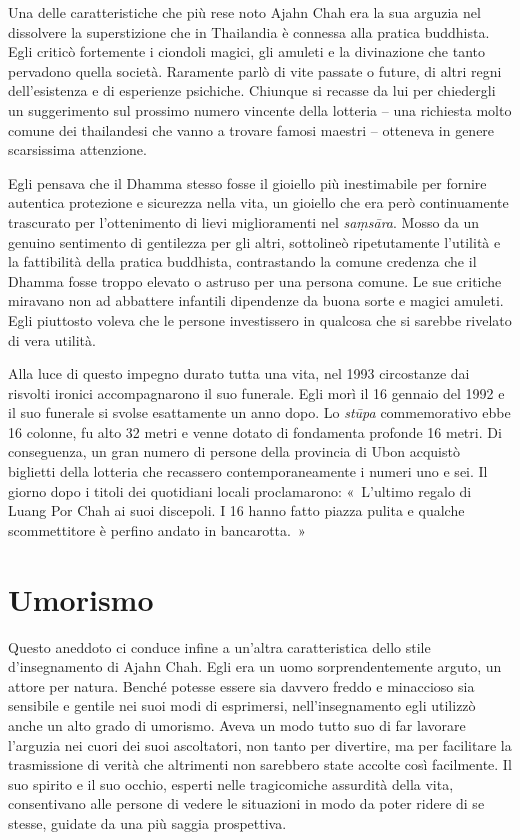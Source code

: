 Una delle caratteristiche che più rese noto Ajahn Chah era la sua
arguzia nel dissolvere la superstizione che in Thailandia è connessa
alla pratica buddhista. Egli criticò fortemente i ciondoli magici, gli
amuleti e la divinazione che tanto pervadono quella società. Raramente
parlò di vite passate o future, di altri regni dell'esistenza e di
esperienze psichiche. Chiunque si recasse da lui per chiedergli un
suggerimento sul prossimo numero vincente della lotteria -- una
richiesta molto comune dei thailandesi che vanno a trovare famosi
maestri -- otteneva in genere scarsissima attenzione.

Egli pensava che il Dhamma stesso fosse il gioiello più inestimabile per
fornire autentica protezione e sicurezza nella vita, un gioiello che era
però continuamente trascurato per l'ottenimento di lievi miglioramenti
nel \emph{saṃsāra}. Mosso da un genuino sentimento di gentilezza per gli
altri, sottolineò ripetutamente l'utilità e la fattibilità della pratica
buddhista, contrastando la comune credenza che il Dhamma fosse troppo
elevato o astruso per una persona comune. Le sue critiche miravano non
ad abbattere infantili dipendenze da buona sorte e magici amuleti. Egli
piuttosto voleva che le persone investissero in qualcosa che si sarebbe
rivelato di vera utilità.

Alla luce di questo impegno durato tutta una vita, nel 1993 circostanze
dai risvolti ironici accompagnarono il suo funerale. Egli morì il 16
gennaio del 1992 e il suo funerale si svolse esattamente un anno dopo.
Lo \emph{stūpa} commemorativo ebbe 16 colonne, fu alto 32 metri e venne
dotato di fondamenta profonde 16 metri. Di conseguenza, un gran numero
di persone della provincia di Ubon acquistò biglietti della lotteria che
recassero contemporaneamente i numeri uno e sei. Il giorno dopo i titoli
dei quotidiani locali proclamarono: «~L'ultimo regalo di Luang Por Chah
ai suoi discepoli. I 16 hanno fatto piazza pulita e qualche
scommettitore è perfino andato in bancarotta.~»

\section{Umorismo}

Questo aneddoto ci conduce infine a un'altra caratteristica dello stile
d'insegnamento di Ajahn Chah. Egli era un uomo sorprendentemente arguto,
un attore per natura. Benché potesse essere sia davvero freddo e
minaccioso sia sensibile e gentile nei suoi modi di esprimersi,
nell'insegnamento egli utilizzò anche un alto grado di umorismo. Aveva
un modo tutto suo di far lavorare l'arguzia nei cuori dei suoi
ascoltatori, non tanto per divertire, ma per facilitare la trasmissione
di verità che altrimenti non sarebbero state accolte così facilmente. Il
suo spirito e il suo occhio, esperti nelle tragicomiche assurdità della
vita, consentivano alle persone di vedere le situazioni in modo da poter
ridere di se stesse, guidate da una più saggia prospettiva.

